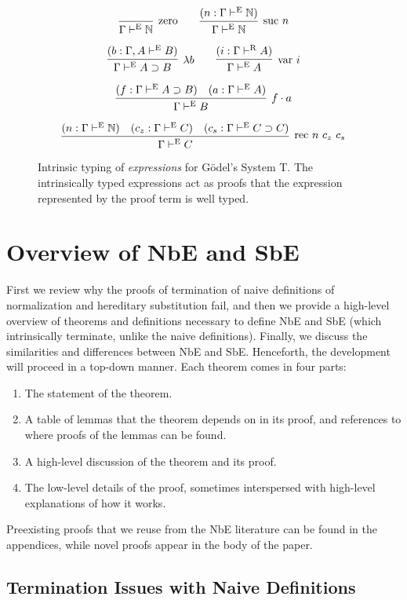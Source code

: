 \documentclass{llncs}
\def\arr{\supset}
\def\app{\cdot}
\def\lam{\lambda}
\def\nat{\mathbb{N}}
\newcommand{\turn}[1]{\vdash^\con{#1}}
\newcommand{\con}[1]{\textmd{#1}}
\newcommand{\fun}[1]{\textmd{#1}}
\newcommand{\type}[1]{\Gamma \turn{E} #1}
\newcommand{\ctype}[2]{\Gamma , #1 \turn{E} #2}
\newcommand{\typr}[1]{\Gamma \turn{R} #1}
\begin{document}
\begin{figure}[t!]
\caption{
Intrinsic typing of \textit{expressions} for G{\"o}del's System T. The
intrinsically typed expressions act as proofs that the expression
represented by the proof term is well typed.
}
$$
\infer
  [\con{zero}]
  {\type{\nat}}
{}
\qquad
\infer
  [\con{suc} ~ n]
  {\type{\nat}}
{
  (n : \type{\nat})
}
$$

$$
\infer
  [\lam b]
  {\type{A \arr B}}
{
  (b : \ctype{A}{B})
}
\qquad
\infer
  [\fun{var} ~ i]
  {\type{A}}
{
  (i : \typr{A})
}
$$

$$
\infer
  [f \app a]
  {\type{B}}
{
  (f : \type{A \arr B})
  &
  (a : \type{A})
}
$$

$$
\infer
  [\fun{rec} ~ n ~ c_z ~ c_s]
  {\type{C}}
{
  (n : \type{\nat})
  &
  (c_z : \type{C})
  &
  (c_s : \type{C \arr C})
}
$$
\label{fig:type}
\end{figure}

\section{Overview of NbE and SbE}
\label{sec:overview}

First we review why the proofs of termination of naive definitions of
normalization and hereditary substitution fail, and then we provide a
high-level overview of theorems and definitions necessary to define NbE
and SbE (which intrinsically terminate, unlike the naive definitions).
Finally, we discuss the similarities and differences between NbE and
SbE.
Henceforth, the development will proceed in a top-down manner.
Each theorem comes in four parts:

\begin{enumerate}
\item{The statement of the theorem.}
\item{A table of lemmas that the theorem depends on in its proof, and
  references to where proofs of the lemmas can be found.}
\item{A high-level discussion of the theorem and its proof.}
\item{The low-level details of the proof, sometimes interspersed with
  high-level explanations of how it works.}
\end{enumerate}

Preexisting proofs that we reuse from the NbE literature can be found
in the appendices, while novel proofs appear in the body of the paper.

\subsection{Termination Issues with Naive Definitions}
\end{document}
